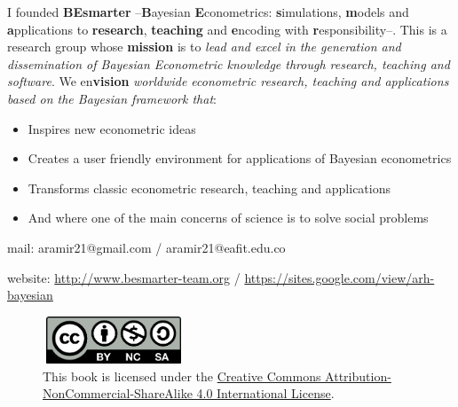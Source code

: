 I founded \textbf{BEsmarter} --\textbf{B}ayesian \textbf{E}conometrics: \textbf{s}imulations, \textbf{m}odels and \textbf{a}pplications to \textbf{research}, \textbf{teaching} and \textbf{e}ncoding with \textbf{r}esponsibility--. This is a research group whose \textbf{mission} is to \textit{lead and excel in the generation and dissemination of Bayesian Econometric knowledge through research, teaching and software}. We en\textbf{vision} \textit{worldwide econometric research, teaching and applications based on the Bayesian framework that}:

\begin{itemize}
	\item Inspires new econometric ideas
	\item Creates a user friendly environment for applications of Bayesian econometrics
	\item Transforms classic econometric research, teaching and applications
	\item And where one of the main concerns of science is to solve social problems    
\end{itemize}

mail: aramir21@gmail.com / aramir21@eafit.edu.co

website: \url{http://www.besmarter-team.org} / \url{https://sites.google.com/view/arh-bayesian}

\begin{figure}[h]
	\includegraphics[width=120pt, height=40pt]{frontmatter/figures/by-nc-sa.png}
	\caption[List of figure caption goes here]{This book is licensed under the \href{http://creativecommons.org/licenses/by-nc-sa/4.0/}{Creative Commons Attribution-NonCommercial-ShareAlike 4.0 International License}.}\label{fig02}
\end{figure}




